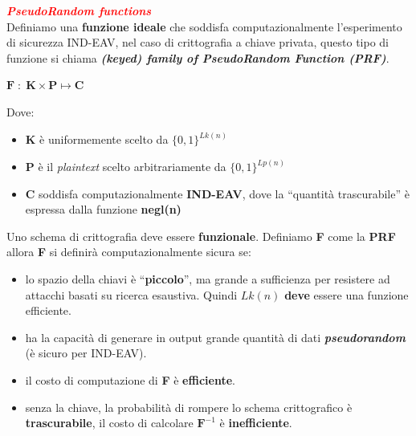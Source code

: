 \begin{flushleft}
    \textcolor{red}{\textbf{\textit{PseudoRandom functions}}} \\
    Definiamo una \textbf{funzione ideale} che soddisfa computazionalmente l'esperimento di sicurezza IND-EAV, nel caso di crittografia a chiave privata, questo tipo di funzione si chiama \textbf{\textit{(keyed) family of PseudoRandom Function (PRF)}}.

    {\centering
        $\mathbf{F} \; : \; \mathbf{K} \times \mathbf{P} \mapsto \mathbf{C}$
    \par}

    Dove:
    \begin{itemize}[nosep]
        \item \textbf{K} è uniformemente scelto da $\{0, 1\}^{Lk(n)}$
        \item \textbf{P} è il \textit{plaintext} scelto arbitrariamente da $\{0,1\}^{Lp(n)}$
        \item \textbf{C} soddisfa computazionalmente \textbf{IND-EAV}, dove la ``quantità trascurabile'' è espressa dalla funzione \textbf{negl(n)} 
    \end{itemize}

    Uno schema di crittografia deve essere \textbf{funzionale}. Definiamo \textbf{F} come la \textbf{PRF} allora \textbf{F} si definirà computazionalmente sicura se:
    \begin{itemize}[nosep]
        \item lo spazio della chiavi è ``\textbf{piccolo}'', ma grande a sufficienza per resistere ad attacchi basati su ricerca esaustiva. Quindi $Lk(n)$ \textbf{deve} essere una funzione efficiente.
        \item ha la capacità di generare in output grande quantità di dati \textbf{\textit{pseudorandom}} (è sicuro per IND-EAV).
        \item il costo di computazione di \textbf{F} è \textbf{efficiente}.
        \item senza la chiave, la probabilità di rompere lo schema crittografico è \textbf{trascurabile}, il costo di calcolare $\mathbf{F}^{-1}$ è \textbf{inefficiente}.
    \end{itemize}
\end{flushleft}

